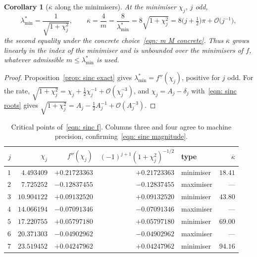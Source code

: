 \documentclass[11pt]{article}
\theoremstyle{plain}
\newtheorem{corollary}[theorem]{Corollary}
\theoremstyle{definition}
\theoremstyle{remark}
\numberwithin{equation}{section}
\providecommand{\kbar}{\overline{\kappa}}
\providecommand{\kbar}{\overline{\kappa}}
\providecommand{\calO}{\mathcal{O}}
\begin{document}
\begin{corollary}[$\kbar$ along the minimisers]
\label{cor: sinc kappa}
    At the minimiser $\chi_j$, $j$ odd,
    \begin{equation}
        \lambda^*_{\min} = \frac{1}{\sqrt{1+\chi_j^2}} ,
        \qquad
        \kbar = \frac{4}{m} = \frac{8}{\lambda^*_{\min}} = 8\sqrt{1+\chi_j^2}
              = 8\bigl(j+\tfrac12\bigr)\pi + \calO\bigl(j^{-1}\bigr) ,
        \label{eqn: sinc kappa}
    \end{equation}
    the second equality under the concrete choice~\eqref{eqn: m M concrete}. Thus $\kbar$ grows
    linearly in the index of the minimiser and is unbounded over the minimisers of $f$, whatever
    admissible $m \leq \lambda^*_{\min}$ is used.
\end{corollary}

\begin{proof}
    Proposition~\ref{prop: sinc exact} gives $\lambda^*_{\min} = f''(\chi_j)$, positive for $j$
    odd. For the rate, $\sqrt{1+\chi_j^2} = \chi_j + \tfrac12\chi_j^{-1} +
    \calO(\chi_j^{-3})$, and $\chi_j = A_j - \delta_j$ with~\eqref{eqn: sinc roots} gives
    $\sqrt{1+\chi_j^2} = A_j - \tfrac12 A_j^{-1} + \calO(A_j^{-3})$.
\end{proof}

\begin{table}[tbp]
    \centering
    \caption{Critical points of~\eqref{eqn: sinc f}. Columns three and four agree to machine
             precision, confirming~\eqref{eqn: sinc magnitude}.}
    \label{tab: sinc values}
    \footnotesize
    \begin{tabular}{@{}rrrrlr@{}}
        \toprule
        $j$ & $\chi_j$ & $f''(\chi_j)$ & $(-1)^{j+1}(1+\chi_j^2)^{-1/2}$ & type & $\kbar$ \\
        \midrule
        $1$ & $4.493409$  & $+0.21723363$ & $+0.21723363$ & minimiser & $18.41$ \\
        $2$ & $7.725252$  & $-0.12837455$ & $-0.12837455$ & maximiser & --- \\
        $3$ & $10.904122$ & $+0.09132520$ & $+0.09132520$ & minimiser & $43.80$ \\
        $4$ & $14.066194$ & $-0.07091346$ & $-0.07091346$ & maximiser & --- \\
        $5$ & $17.220755$ & $+0.05797180$ & $+0.05797180$ & minimiser & $69.00$ \\
        $6$ & $20.371303$ & $-0.04902962$ & $-0.04902962$ & maximiser & --- \\
        $7$ & $23.519452$ & $+0.04247962$ & $+0.04247962$ & minimiser & $94.16$ \\
        \bottomrule
    \end{tabular}
\end{table}
\end{document}

